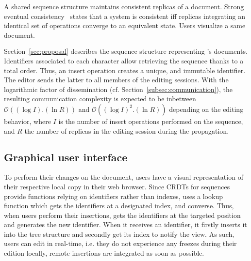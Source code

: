 A shared sequence structure maintains consistent replicas of a document. Strong
eventual consistency~\cite{shapiro2011comprehensive} states that a system is
consistent iff replicas integrating an identical set of operations converge to
an equivalent state. Users visualize a same document.

Section~\ref{sec:proposal} describes the sequence structure representing
\CRATE's documents. Identifiers associated to each character allow retrieving
the sequence thanks to a total order. Thus, an insert operation creates a
unique, and immutable identifier. The editor sends the latter to all members of
the editing sessions. With the logarithmic factor of dissemination
(cf. Section~\ref{subsec:communication}), the resulting communication complexity
is expected to be inbetween $\mathcal{O}((\log I).(\ln R))$ and
$\mathcal{O}((\log I)^2.(\ln R))$ depending on the editing behavior, where $I$
is the number of insert operations performed on the sequence, and $R$ the number
of replicas in the editing session during the propagation.
    
\subsection{Graphical user interface}

To perform their changes on the document, users have a visual representation of
their respective local copy in their web browser.  Since CRDTs for sequences
provide functions relying on identifiers rather than indexes, \CRATE uses a
lookup function which gets the identifiers at a designated index, and converse.
Thus, when users perform their insertions, \CRATE gets the identifiers at the
targeted position and generates the new identifier. When it receives an
identifier, it firstly inserts it into the tree structure and secondly get its
index to notify the view. As such, users can edit in real-time, i.e. they do not
experience any freezes during their edition locally, remote insertions are
integrated as soon as possible.




